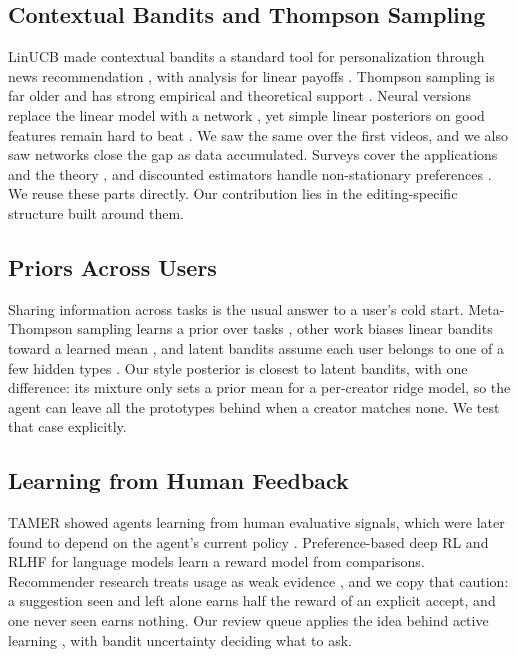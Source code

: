 \documentclass{ieeeaccess}
\begin{document}
\subsection{Contextual Bandits and Thompson Sampling}
LinUCB made contextual bandits a standard tool for personalization through news recommendation \cite{li2010}, with analysis for linear payoffs \cite{chu2011}. Thompson sampling is far older \cite{thompson1933} and has strong empirical and theoretical support \cite{kaufmann2012,agrawal2013,abeille2017,russo2018}. Neural versions replace the linear model with a network \cite{zhou2020neural}, yet simple linear posteriors on good features remain hard to beat \cite{riquelme2018}. We saw the same over the first videos, and we also saw networks close the gap as data accumulated. Surveys cover the applications \cite{bouneffouf2020} and the theory \cite{lattimore2020}, and discounted estimators handle non-stationary preferences \cite{russac2019}. We reuse these parts directly. Our contribution lies in the editing-specific structure built around them.

\subsection{Priors Across Users}
Sharing information across tasks is the usual answer to a user's cold start. Meta-Thompson sampling learns a prior over tasks \cite{kveton2021meta}, other work biases linear bandits toward a learned mean \cite{cella2020meta}, and latent bandits assume each user belongs to one of a few hidden types \cite{hong2020latent}. Our style posterior is closest to latent bandits, with one difference: its mixture only sets a prior mean for a per-creator ridge model, so the agent can leave all the prototypes behind when a creator matches none. We test that case explicitly.

\subsection{Learning from Human Feedback}
TAMER \cite{knox2009} showed agents learning from human evaluative signals, which were later found to depend on the agent's current policy \cite{macglashan2017}. Preference-based deep RL \cite{christiano2017} and RLHF for language models \cite{ouyang2022} learn a reward model from comparisons. Recommender research treats usage as weak evidence \cite{hu2008}, and we copy that caution: a suggestion seen and left alone earns half the reward of an explicit accept, and one never seen earns nothing. Our review queue applies the idea behind active learning \cite{settles2012}, with bandit uncertainty deciding what to ask.
\end{document}
